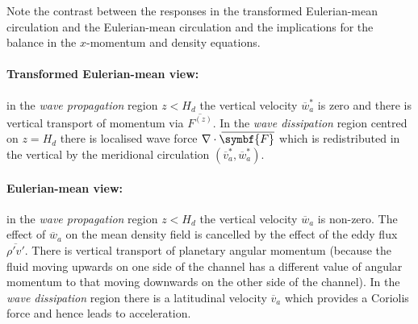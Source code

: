 \documentclass{jknotes}
\newcommand{\myol}[2][3]{{}\mkern#1mu\overline{\mkern-#1mu#2}}
\begin{document}
{
}

Note the contrast between the responses in the transformed Eulerian-mean
circulation and the Eulerian-mean circulation and the implications for the
balance in the $x$-momentum and density equations.

\paragraph{Transformed Eulerian-mean view:} in the \emph{wave propagation}
region $z < H_d$ the vertical velocity $\overline{w}_a^*$ is zero and there is
vertical transport of momentum via $\overline{F^{(z)}}$. In the \emph{wave
dissipation} region centred on $z=H_d$ there is localised wave force $\nabla
\cdot \myol[4]{\symbf{F}}$ which is redistributed in the vertical by the
meridional circulation $(\overline{v}_a^*, \overline{w}_a^*)$. 

\paragraph{Eulerian-mean view:} in the \emph{wave propagation} region $z <
H_d$ the vertical velocity $\overline{w}_a$ is non-zero. The effect of
$\overline{w}_a$ on the mean density field is cancelled by the effect of the
eddy flux $\overline{\rho'v'}$. There is vertical transport of planetary
angular momentum (because the fluid moving upwards on one side of the channel
has a different value of angular momentum to that moving downwards on the
other side of the channel). In the \emph{wave dissipation} region there is a
latitudinal velocity $\overline{v}_a$ which provides a Coriolis force and
hence leads to acceleration.
\end{document}
